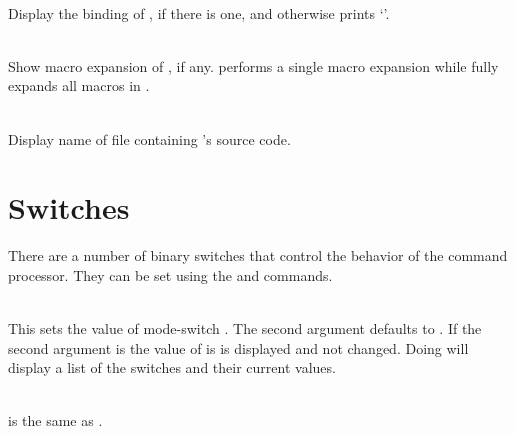 \begin{description}
\item {}\\
    Display the binding of , if there is one, and otherwise
    prints `'.
 
\item {}
\T\vspace{-1em}
\item {}\\
    Show macro expansion of , if any.
     performs a single macro expansion while
     fully expands all macros in .

\item {}\\
    Display name of file containing 's source code.
\end{description}

\section{Switches}

There are a number of binary switches that control the behavior of the
 command processor.
They can be set using the  and  commands.

\begin{description}
\item {}\\
    This sets the value of mode-switch .
    The second argument defaults to .
    If the second argument is  the value of  is
    is displayed and not changed.
    Doing  will display a list of the switches and
    their current values.

\item {}\\
     is the same as
    .
\end{description}

